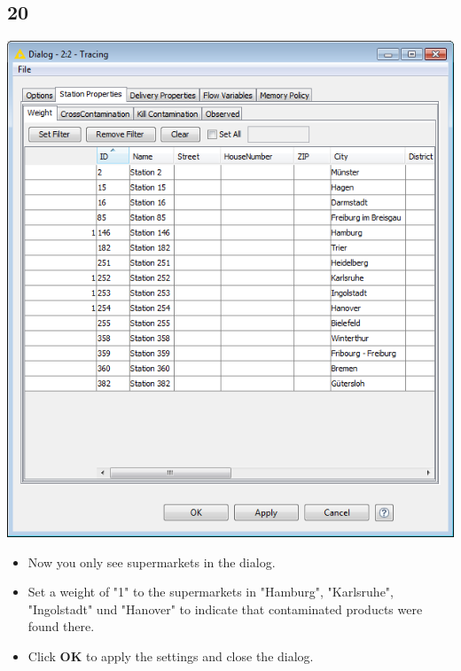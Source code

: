 \documentclass{beamer}
\begin{document}
\subsection{20}
\begin{frame}
	\begin{center}
  		\includegraphics[height=0.6\textheight]{20.png}
	\end{center}
	\begin{itemize}
		\item Now you only see supermarkets in the dialog.
		\item Set a weight of "1" to the supermarkets in "Hamburg", "Karlsruhe", "Ingolstadt" und "Hanover" to indicate that contaminated products were found there.
		\item Click \textbf{OK} to apply the settings and close the dialog.
	\end{itemize}
\end{frame}
\end{document}
